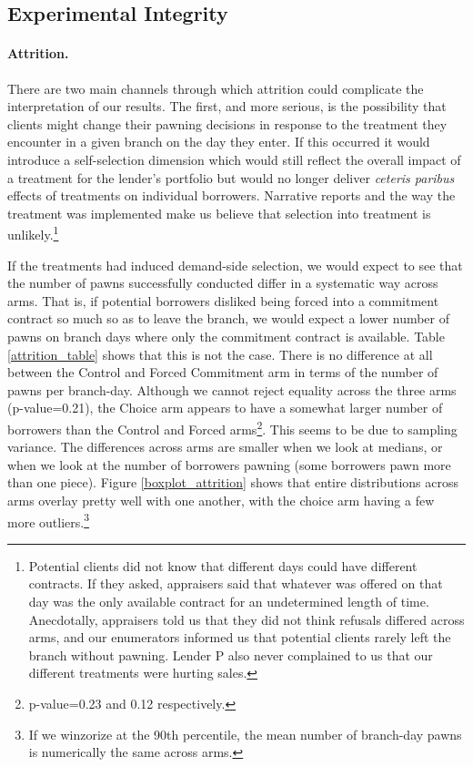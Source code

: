\documentclass[oneside,11pt]{article}
\begin{document}
\subsection{Experimental Integrity}
\label{sec:integrity}

\paragraph{Attrition.} There are two main channels through which attrition could complicate the interpretation of our results. The first, and more serious, is the possibility that clients might change their pawning decisions in response to the treatment they encounter in a given branch on the day they enter.  If this occurred it would introduce a self-selection dimension which would still reflect the overall impact of a treatment for the lender's portfolio but would no longer deliver \textit{ceteris paribus} effects of treatments on individual borrowers.  Narrative reports and the way the treatment was implemented make us believe that selection into treatment is unlikely.\footnote{Potential clients did not know that different days could have different contracts. If they asked, appraisers said that whatever was offered on that day was the only available contract for an undetermined length of time. Anecdotally, appraisers told us that they did not think refusals differed across arms, and our enumerators informed us that potential clients rarely left the branch without pawning. Lender P also never complained to us that our different treatments were hurting sales.} 

If the treatments had induced demand-side selection, we would expect to see that the number of pawns successfully conducted differ in a systematic way across arms. That is, if potential borrowers disliked being forced into a commitment contract so much so as to leave the branch, we would expect a lower number of pawns on branch days where only the commitment contract is available. Table \ref{attrition_table} shows that this is not the case. There is no difference at all between the Control and Forced Commitment arm in terms of the number of pawns per branch-day. Although we cannot reject equality across the three arms (p-value=0.21), the Choice arm appears to have a somewhat larger number of borrowers than the Control and Forced arms\footnote{p-value=0.23 and 0.12 respectively.}. This seems to be due to sampling variance. The differences across arms are smaller when we look at medians, or when we look at the number of borrowers pawning (some borrowers pawn more than one piece). Figure \ref{boxplot_attrition} shows that entire distributions across arms overlay pretty well with one another, with the choice arm having a few more outliers.\footnote{If we winzorize at the 90th percentile, the mean number of branch-day pawns is numerically the same across arms.}
\end{document}
